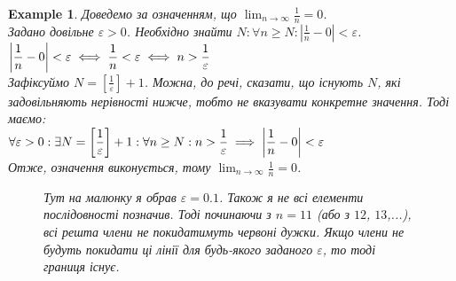 \documentclass[a4paper, 14pt]{article}
\def\huge{\displaystyle}
\theoremstyle{theoremdd}
\theoremstyle{theoremdd}
\theoremstyle{theoremdd}
\theoremstyle{theoremdd}
\newtheorem{example}[theorem]{Example}
\theoremstyle{theoremdd}
\theoremstyle{theoremdd}
\theoremstyle{theoremdd}
\theoremstyle{theoremdd}
\begin{document}
	\begin{example}
	Доведемо за означенням, що $\displaystyle\lim_{n \to \infty} \frac{1}{n} = 0$.\\
	Задано довільне $\varepsilon > 0$. Необхідно знайти $\displaystyle N: \forall n \geq N: \left|\frac{1}{n}-0 \right|<\varepsilon$.\\
	$\huge \abs{\frac{1}{n} - 0} < \varepsilon \iff \displaystyle \frac{1}{n}<\varepsilon \iff n > \frac{1}{\varepsilon}$\\
	Зафіксуймо $\displaystyle N = \left[\frac{1}{\varepsilon} \right] + 1$. Можна, до речі, сказати, що існують $N$, які задовільняють нерівності нижче, тобто не вказувати конкретне значення. Тоді маємо:\\
	$\forall \varepsilon > 0: \exists N = \huge \left[\frac{1}{\varepsilon} \right] + 1: \forall n \geq N: n > \frac{1}{\varepsilon} \implies \abs{\frac{1}{n} - 0} < \varepsilon$\\
	Отже, означення виконується, тому $\displaystyle\lim_{n \to \infty} \frac{1}{n} = 0$.
	\begin{figure}[H]
	\centering
	\resizebox{0.8\textwidth}{!} {
}
	\caption*{Тут на малюнку я обрав $\varepsilon = 0.1$. Також я не всі елементи послідовності позначив. Тоді починаючи з $n=11$ (або з $12$, $13$,...), всі решта члени не покидатимуть червоні дужки. Якщо члени не будуть покидати ці лінії для будь-якого заданого $\varepsilon$, то тоді границя існує.}
	\end{figure}
	\end{example}
\end{document}
